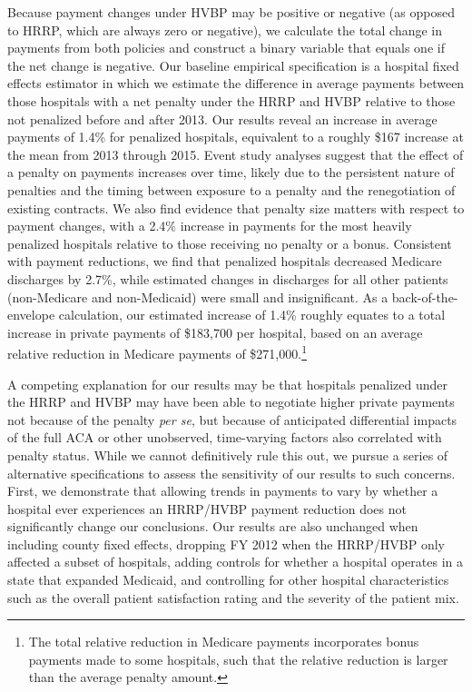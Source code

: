 \documentclass[12pt]{article}
\begin{document}
Because payment changes under HVBP may be positive or negative (as opposed to HRRP, which are always zero or negative), we calculate the total change in payments from both policies and construct a binary variable that equals one if the net change is negative.  Our baseline empirical specification is a hospital fixed effects estimator in which we estimate the difference in average payments between those hospitals with a net penalty under the HRRP and HVBP relative to those not penalized before and after 2013. Our results reveal an increase in average payments of 1.4\% for penalized hospitals, equivalent to a roughly \$167 increase at the mean from 2013 through 2015. Event study analyses suggest that the effect of a penalty on payments increases over time, likely due to the persistent nature of penalties and the timing between exposure to a penalty and the renegotiation of existing contracts. We also find evidence that penalty size matters with respect to payment changes, with a 2.4$\%$ increase in payments for the most heavily penalized hospitals relative to those receiving no penalty or a bonus. Consistent with payment reductions, we find that penalized hospitals decreased Medicare discharges by 2.7\%, while estimated changes in discharges for all other patients (non-Medicare and non-Medicaid) were small and insignificant. As a back-of-the-envelope calculation, our estimated increase of 1.4\% roughly equates to a total increase in private payments of \$183,700 per hospital, based on an average relative reduction in Medicare payments of \$271,000.\footnote{The total relative reduction in Medicare payments incorporates bonus payments made to some hospitals, such that the relative reduction is larger than the average penalty amount.}

A competing explanation for our results may be that hospitals penalized under the HRRP and HVBP may have been able to negotiate higher private payments not because of the penalty \textit{per se}, but because of anticipated differential impacts of the full ACA or other unobserved, time-varying factors also correlated with penalty status. While we cannot definitively rule this out, we pursue a series of alternative specifications to assess the sensitivity of our results to such concerns. First, we demonstrate that allowing trends in payments to vary by whether a hospital ever experiences an HRRP/HVBP payment reduction does not significantly change our conclusions. Our results are also unchanged when including county fixed effects, dropping FY 2012 when the HRRP/HVBP only affected a subset of hospitals, adding controls for whether a hospital operates in a state that expanded Medicaid, and controlling for other hospital characteristics such as the overall patient satisfaction rating and the severity of the patient mix.
\end{document}
